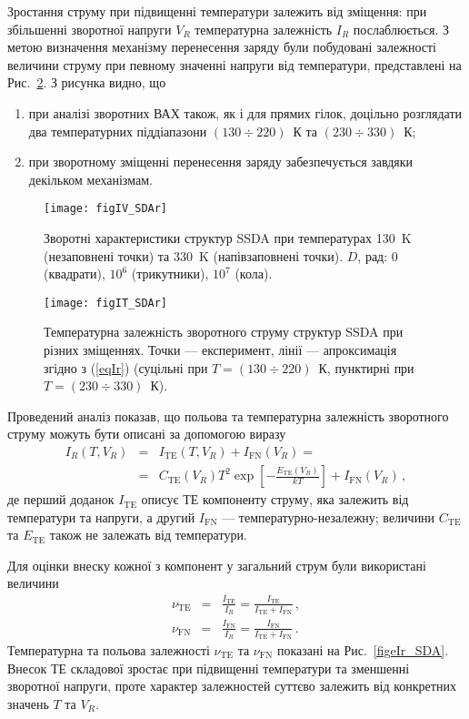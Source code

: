 Зростання струму при підвищенні температури залежить від зміщення:
при збільшенні зворотної напруги $V_R$ температурна залежність $I_R$ послаблюється.
З метою визначення механізму перенесення заряду були побудовані залежності величини струму при певному значенні напруги від температури,
представлені на Рис.~\ref{figIT_SDAr}.
З рисунка видно, що
\begin{enumerate}[label=\asbuk*),leftmargin=0em,itemindent=1.5em]
\item при аналізі зворотних ВАХ також, як і для прямих гілок, доцільно розглядати два температурних піддіапазони $(130\div220)$~К та $(230\div330)$~К;
\item при зворотному зміщенні перенесення заряду забезпечується завдяки декільком механізмам.
\end{enumerate}



\begin{figure}
\center
\texttt{[image: figIV\_SDAr]}
\caption{\label{figIV_SDAr}
Зворотні характеристики структур SSDA при температурах 130~K (незаповнені точки)
та 330~K (напівзаповнені точки).
$D$, рад: 0 (квадрати), $10^6$ (трикутники), $10^7$ (кола).
}%
\end{figure}


\begin{figure}
\center
\texttt{[image: figIT\_SDAr]}
\caption{\label{figIT_SDAr}
Температурна залежність зворотного струму структур SSDA при різних зміщеннях.
Точки --- експеримент, лінії --- апроксимація згідно з (\ref{eqIr})
(суцільні при $T=(130\div220)$~К, пунктирні при $T=(230\div330)$~К).
}%
\end{figure}

Проведений аналіз показав, що польова та температурна залежність зворотного струму можуть бути описані
за допомогою виразу
\begin{eqnarray}
\label{eqIr}
\nonumber I_R(T,V_R)&=&I_\mathrm{TE}(T,V_R)+I_\mathrm{FN}(V_R)=\\
&=&C_\mathrm{TE}(V_R)T^2\exp\left[-\frac{E_\mathrm{TE}(V_R)}{kT}\right]+I_\mathrm{FN}(V_R)\,,
\end{eqnarray}
де перший доданок $I_\mathrm{TE}$ описує ТЕ компоненту струму, яка залежить від температури та напруги,
а другий $I_\mathrm{FN}$ --- температурно-незалежну;
величини  $C_\mathrm{TE}$ та $E_\mathrm{TE}$ також не залежать від температури.

\label{nu_IR}
Для оцінки внеску кожної з компонент у загальний струм були використані величини
\begin{eqnarray*}
\nu_\mathrm{TE}&=&\frac{I_\mathrm{TE}}{I_R}=\frac{I_\mathrm{TE}}{I_\mathrm{TE}+I_\mathrm{FN}}\,,\\
\nu_\mathrm{FN}&=&\frac{I_\mathrm{FN}}{I_R}=\frac{I_\mathrm{FN}}{I_\mathrm{TE}+I_\mathrm{FN}}\,.
\end{eqnarray*}
Температурна та польова залежності $\nu_\mathrm{TE}$ та $\nu_\mathrm{FN}$ показані на Рис.~\ref{figeIr_SDA}.
Внесок ТЕ складової зростає при підвищенні температури та зменшенні зворотної напруги, проте характер
залежностей суттєво залежить від конкретних значень $T$ та $V_R$.


